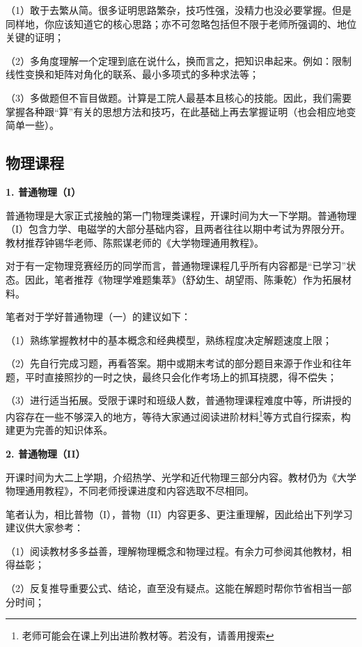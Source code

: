 \documentclass[11pt,oneside]{book}
\begin{document}
（1）敢于去繁从简。很多证明思路繁杂，技巧性强，没精力也没必要掌握。但是同样地，你应该知道它的核心思路；亦不可忽略包括但不限于老师所强调的、地位关键的证明；

（2）多角度理解一个定理到底在说什么，换而言之，把知识串起来。例如：限制线性变换和矩阵对角化的联系、最小多项式的多种求法等；

（3）多做题但不盲目做题。计算是工院人最基本且核心的技能。因此，我们需要掌握各种跟“算”有关的思想方法和技巧，在此基础上再去掌握证明（也会相应地变简单一些）。

\subsection{物理课程}
\textbf{1. 普通物理（I）}

普通物理是大家正式接触的第一门物理类课程，开课时间为大一下学期。普通物理（I）包含力学、电磁学的大部分基础内容，且两者往往以期中考试为界限分开。教材推荐钟锡华老师、陈熙谋老师的《大学物理通用教程》。

对于有一定物理竞赛经历的同学而言，普通物理课程几乎所有内容都是“已学习”状态。因此，笔者推荐《物理学难题集萃》（舒幼生、胡望雨、陈秉乾）作为拓展材料。

\vspace{20pt}

笔者对于学好普通物理（一）的建议如下：

（1）熟练掌握教材中的基本概念和经典模型，熟练程度决定解题速度上限；

（2）先自行完成习题，再看答案。期中或期末考试的部分题目来源于作业和往年题，平时直接照抄的一时之快，最终只会化作考场上的抓耳挠腮，得不偿失；

（3）进行适当拓展。受限于课时和班级人数，普通物理课程难度中等，所讲授的内容存在一些不够深入的地方，等待大家通过阅读进阶材料\footnote{老师可能会在课上列出进阶教材等。若没有，请善用搜索}等方式自行探索，构建更为完善的知识体系。

\vspace{20pt}

\textbf{2. 普通物理（II）}

开课时间为大二上学期，介绍热学、光学和近代物理三部分内容。教材仍为《大学物理通用教程》，不同老师授课进度和内容选取不尽相同。

笔者认为，相比普物（I），普物（II）内容更多、更注重理解，因此给出下列学习建议供大家参考：

（1）阅读教材多多益善，理解物理概念和物理过程。有余力可参阅其他教材，相得益彰；

（2）反复推导重要公式、结论，直至没有疑点。这能在解题时帮你节省相当一部分时间；
\end{document}
